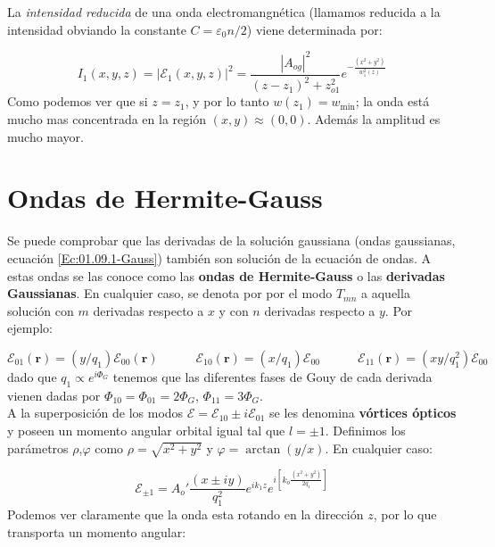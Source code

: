 \documentclass[12pt,a4paper]{book}
\numberwithin{equation}{section}
\numberwithin{figure}{section}
\newcommand{\tquad}{\quad \quad \quad}
\newcommand{\parentesis}[1]{\left( #1  \right)}
\newcommand{\ccorchetes}[1]{\left[ #1  \right]}
\newcommand{\1}{_{(1)}}
\newcommand{\2}{_{(2)}}
\newcommand{\rn}{\mathbf{r}}
\theoremstyle{definition}
\begin{document}
La \textit{intensidad reducida} de una onda electromangnética (llamamos reducida a la intensidad obviando la constante $C = \varepsilon_0 n / 2$) viene determinada por:

\begin{equation}
I_1 (x,y,z) = |\mathcal{E}_1 (x,y,z)|^2 = \dfrac{|A_{og}|^2}{(z-z_1)^2+z_{o1}^2} e^{-\frac{(x^2+y^2)}{w_1^2 (z)}}
\end{equation}
Como podemos ver que si $z=z_1$, y por lo tanto $w(z_1)=w_{\min}$; la onda está mucho mas concentrada en la región $(x,y)\approx(0,0)$. Además la amplitud es mucho mayor. 


\section{Ondas de Hermite-Gauss}

Se puede comprobar que las derivadas de la solución gaussiana (ondas gaussianas, ecuación \ref{Ec:01.09.1-Gauss}) también son solución de la ecuación de ondas. A estas ondas se las conoce como las \textbf{ondas de Hermite-Gauss} o las \textbf{derivadas Gaussianas}. En cualquier caso, se denota por por el modo $T_{mn}$ a aquella solución con $m$ derivadas respecto a $x$ y con $n$ derivadas respecto a $y$. Por ejemplo:

\begin{equation}
\mathcal{E}_{01}  (\rn) =  (y/q_1) \mathcal{E}_{00} (\rn) \tquad \mathcal{E}_{10} (\rn) = (x/q_1) \mathcal{E}_{00} \tquad \mathcal{E}_{11} (\rn) = (xy/q_1^2) \mathcal{E}_{00}
\end{equation}
dado que $q_1 \propto e^{i \Phi_G}$ tenemos que las diferentes fases de Gouy de cada derivada vienen dadas por $\Phi_{10} = \Phi_{01} = 2 \Phi_G$, $\Phi_{11} = 3 \Phi_G $.  \\

A la superposición de los modos $\mathcal{E} = \mathcal{E}_{10} \pm i \mathcal{E}_{01}$ se les denomina \textbf{vórtices ópticos} y poseen un momento angular orbital igual tal que $l=\pm 1$. Definimos los parámetros $\rho$,$\varphi$ como $\rho = \sqrt{x^2 + y^2}$ y $\varphi = \arctan \parentesis{y/x}$. En cualquier caso:

\begin{equation}
\mathcal{E}_{\pm 1} = A_o ' \frac{(x \pm i y)}{q_1^2} e^{i k_1 z} e^{i \ccorchetes{k_o \frac{(x^2 + y^2)}{2 q_1}}}
\end{equation}
Podemos ver claramente que la onda esta rotando en la dirección $z$, por lo que transporta un momento angular:
\end{document}
